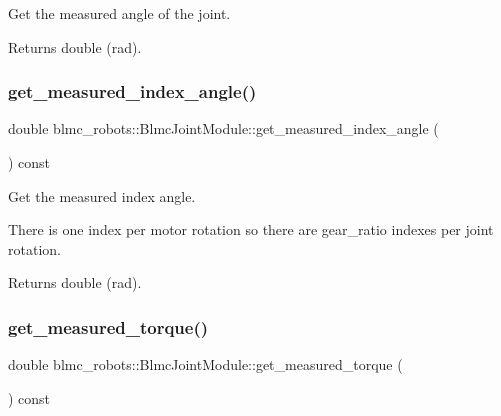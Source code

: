 Get the measured angle of the joint. 

\begin{DoxyReturn}{Returns}
double (rad). 
\end{DoxyReturn}
\mbox{\label{classblmc__robots_1_1BlmcJointModule_a47b6a71bb9c300d2398924403a6e7e3c}} 
\subsubsection{\texorpdfstring{get\+\_\+measured\+\_\+index\+\_\+angle()}{get\_measured\_index\_angle()}}
{\footnotesize\ttfamily double blmc\+\_\+robots\+::\+Blmc\+Joint\+Module\+::get\+\_\+measured\+\_\+index\+\_\+angle (\begin{DoxyParamCaption}{ }\end{DoxyParamCaption}) const}



Get the measured index angle. 

There is one index per motor rotation so there are gear\+\_\+ratio indexes per joint rotation.

\begin{DoxyReturn}{Returns}
double (rad). 
\end{DoxyReturn}
\mbox{\label{classblmc__robots_1_1BlmcJointModule_abb57fdffcc0222b192658239ef45ab63}} 
\subsubsection{\texorpdfstring{get\+\_\+measured\+\_\+torque()}{get\_measured\_torque()}}
{\footnotesize\ttfamily double blmc\+\_\+robots\+::\+Blmc\+Joint\+Module\+::get\+\_\+measured\+\_\+torque (\begin{DoxyParamCaption}{ }\end{DoxyParamCaption}) const}



